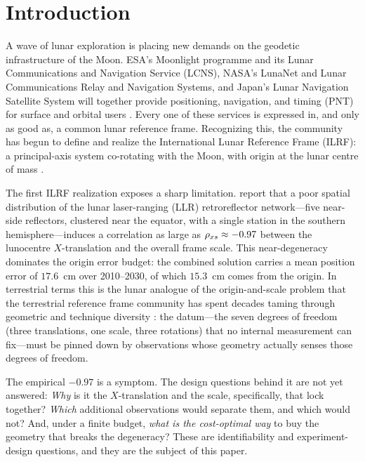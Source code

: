 \section{Introduction}
\label{sec:intro}

A wave of lunar exploration is placing new demands on the geodetic
infrastructure of the Moon. ESA's Moonlight programme and its Lunar
Communications and Navigation Service (LCNS), NASA's LunaNet and Lunar
Communications Relay and Navigation Systems, and Japan's Lunar Navigation
Satellite System will together provide positioning, navigation, and timing (PNT)
for surface and orbital users \citep{israel2020lunanet,fienga2024moonlight}. Every
one of these services is expressed in, and only as good as, a common lunar
reference frame. Recognizing this, the community has begun to define and realize
the International Lunar Reference Frame (ILRF): a principal-axis system co-rotating
with the Moon, with origin at the lunar centre of mass \citep{sosnica2025ilrf}.

The first ILRF realization exposes a sharp limitation. \citet{sosnica2025ilrf}
report that a poor spatial distribution of the lunar laser-ranging (LLR)
retroreflector network---five near-side reflectors, clustered near the equator,
with a single station in the southern hemisphere---induces a correlation as large
as $\rho_{x s} \approx -0.97$ between the lunocentre $X$-translation and the overall
frame scale. This near-degeneracy dominates the origin error budget: the combined
solution carries a mean position error of $17.6$~cm over 2010--2030, of which
$15.3$~cm comes from the origin. In terrestrial terms this is the lunar analogue
of the origin-and-scale problem that the terrestrial reference frame community has
spent decades taming through geometric and technique diversity
\citep{altamimi2016itrf2014}: the datum---the seven degrees of freedom (three
translations, one scale, three rotations) that no internal measurement can
fix---must be pinned down by observations whose geometry actually senses those
degrees of freedom.

The empirical $-0.97$ is a symptom. The design questions behind it are not yet
answered: \emph{Why} is it the $X$-translation and the scale, specifically, that
lock together? \emph{Which} additional observations would separate them, and
which would not? And, under a finite budget, \emph{what is the cost-optimal way}
to buy the geometry that breaks the degeneracy? These are identifiability and
experiment-design questions, and they are the subject of this paper.

